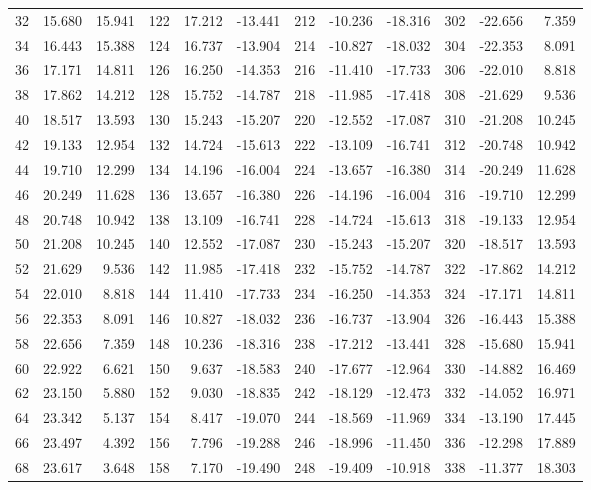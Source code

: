 \begin{table}
{\begin{tabular}{rrr|rrr|rrr|rrr}
 32 &  15.680 & 15.941 & 122 &  17.212 & -13.441 & 212 & -10.236 & -18.316 & 302 & -22.656 &  7.359\\
 34 &  16.443 & 15.388 & 124 &  16.737 & -13.904 & 214 & -10.827 & -18.032 & 304 & -22.353 &  8.091\\
 36 &  17.171 & 14.811 & 126 &  16.250 & -14.353 & 216 & -11.410 & -17.733 & 306 & -22.010 &  8.818\\
 38 &  17.862 & 14.212 & 128 &  15.752 & -14.787 & 218 & -11.985 & -17.418 & 308 & -21.629 &  9.536\\
 40 &  18.517 & 13.593 & 130 &  15.243 & -15.207 & 220 & -12.552 & -17.087 & 310 & -21.208 & 10.245\\
 42 &  19.133 & 12.954 & 132 &  14.724 & -15.613 & 222 & -13.109 & -16.741 & 312 & -20.748 & 10.942\\
 44 &  19.710 & 12.299 & 134 &  14.196 & -16.004 & 224 & -13.657 & -16.380 & 314 & -20.249 & 11.628\\
 46 &  20.249 & 11.628 & 136 &  13.657 & -16.380 & 226 & -14.196 & -16.004 & 316 & -19.710 & 12.299\\
 48 &  20.748 & 10.942 & 138 &  13.109 & -16.741 & 228 & -14.724 & -15.613 & 318 & -19.133 & 12.954\\
 50 &  21.208 & 10.245 & 140 &  12.552 & -17.087 & 230 & -15.243 & -15.207 & 320 & -18.517 & 13.593\\
 52 &  21.629 &  9.536 & 142 &  11.985 & -17.418 & 232 & -15.752 & -14.787 & 322 & -17.862 & 14.212\\
 54 &  22.010 &  8.818 & 144 &  11.410 & -17.733 & 234 & -16.250 & -14.353 & 324 & -17.171 & 14.811\\
 56 &  22.353 &  8.091 & 146 &  10.827 & -18.032 & 236 & -16.737 & -13.904 & 326 & -16.443 & 15.388\\
 58 &  22.656 &  7.359 & 148 &  10.236 & -18.316 & 238 & -17.212 & -13.441 & 328 & -15.680 & 15.941\\
 60 &  22.922 &  6.621 & 150 &   9.637 & -18.583 & 240 & -17.677 & -12.964 & 330 & -14.882 & 16.469\\
 62 &  23.150 &  5.880 & 152 &   9.030 & -18.835 & 242 & -18.129 & -12.473 & 332 & -14.052 & 16.971\\
 64 &  23.342 &  5.137 & 154 &   8.417 & -19.070 & 244 & -18.569 & -11.969 & 334 & -13.190 & 17.445\\
 66 &  23.497 &  4.392 & 156 &   7.796 & -19.288 & 246 & -18.996 & -11.450 & 336 & -12.298 & 17.889\\
 68 &  23.617 &  3.648 & 158 &   7.170 & -19.490 & 248 & -19.409 & -10.918 & 338 & -11.377 & 18.303\\

\end{tabular}}
\end{table}
